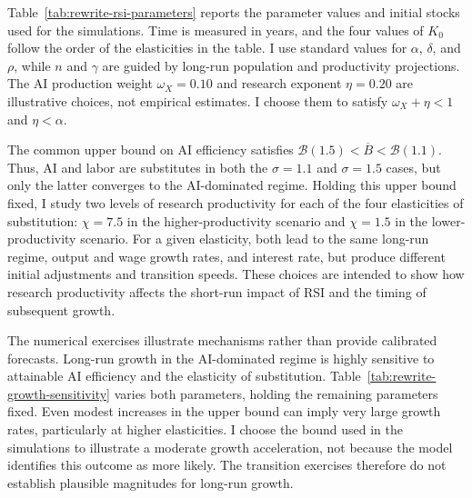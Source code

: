 Table~\ref{tab:rewrite-rsi-parameters} reports the parameter values and initial stocks used for the simulations. Time is measured in years, and the four values of $K_0$ follow the order of the elasticities in the table. I use standard values for $\alpha$, $\delta$, and $\rho$, while $n$ and $\gamma$ are guided by long-run population and productivity projections. The AI production weight $\omega_X=0.10$ and research exponent $\eta=0.20$ are illustrative choices, not empirical estimates. I choose them to satisfy $\omega_X+\eta<1$ and $\eta<\alpha$.

The common upper bound on AI efficiency satisfies $\mathcal B(1.5)<\overline B<\mathcal B(1.1)$. Thus, AI and labor are substitutes in both the $\sigma=1.1$ and $\sigma=1.5$ cases, but only the latter converges to the AI-dominated regime. Holding this upper bound fixed, I study two levels of research productivity for each of the four elasticities of substitution: $\chi=7.5$ in the higher-productivity scenario and $\chi=1.5$ in the lower-productivity scenario. For a given elasticity, both lead to the same long-run regime, output and wage growth rates, and interest rate, but produce different initial adjustments and transition speeds. These choices are intended to show how research productivity affects the short-run impact of RSI and the timing of subsequent growth.




The numerical exercises illustrate mechanisms rather than provide calibrated
forecasts. Long-run growth in the AI-dominated regime is highly sensitive
to attainable AI efficiency and the elasticity of substitution.
Table~\ref{tab:rewrite-growth-sensitivity} varies both parameters, holding
the remaining parameters fixed. Even modest increases in the upper bound
can imply very large growth rates, particularly at higher elasticities.
I choose the bound used in the simulations to illustrate a moderate growth
acceleration, not because the model identifies this outcome as more likely.
The transition exercises therefore do not establish plausible magnitudes
for long-run growth.

